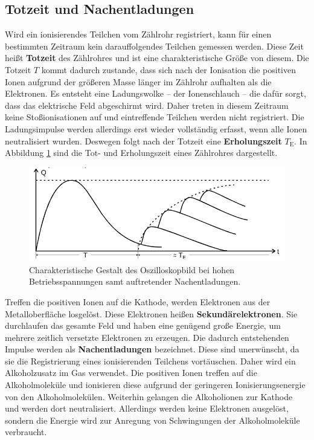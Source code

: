 \subsection{Totzeit und Nachentladungen}
Wird ein ionisierendes Teilchen vom Zählrohr registriert, kann für einen bestimmten Zeitraum
kein darauffolgendes Teilchen gemessen werden.
Diese Zeit heißt \textbf{Totzeit} des Zählrohres und ist eine charakteristische Größe von diesem.
Die Totzeit $T$ kommt dadurch zustande, dass sich nach der Ionisation die positiven Ionen
aufgrund der größeren Masse länger im Zählrohr aufhalten als die Elektronen.
Es entsteht eine Ladungswolke -- der Ionenschlauch -- die dafür sorgt, dass das elektrische Feld
abgeschirmt wird. Daher treten in diesem Zeitraum keine Stoßionisationen auf und eintreffende
Teilchen werden nicht registriert.
Die Ladungsimpulse werden allerdings erst wieder vollständig erfasst, wenn alle Ionen neutralisiert
wurden. Deswegen folgt nach der Totzeit eine \textbf{Erholungszeit} $T_{\mathrm{E}}$.
In Abbildung \ref{fig:nachladen} sind die Tot- und Erholungszeit eines Zählrohres dargestellt.
\begin{figure}
  \centering
  \includegraphics[width=\textwidth]{Bilder/erholzeit.png}
  \caption{Charakteristische Gestalt des Oszilloskopbild bei hohen Betriebsspannungen samt auftretender Nachentladungen. \cite{Anleitung}}
  \label{fig:nachladen}
\end{figure}

Treffen die positiven Ionen auf die Kathode, werden Elektronen aus der Metalloberfläche
losgelöst. Diese Elektronen heißen \textbf{Sekundärelektronen}. Sie durchlaufen das gesamte
Feld und haben eine genügend große Energie, um mehrere zeitlich versetzte Elektronen
zu erzeugen. Die dadurch entstehenden Impulse werden als \textbf{Nachentladungen} bezeichnet.
Diese sind unerwünscht, da sie die Registrierung eines ionisierenden Teilchens vortäuschen.
Daher wird ein Alkoholzusatz im Gas verwendet. Die positiven Ionen treffen auf die
Alkoholmoleküle und ionisieren diese aufgrund der geringeren Ionisierungsenergie von den
Alkoholmolekülen. Weiterhin gelangen die Alkoholionen zur Kathode und werden dort neutralisiert.
Allerdings werden keine Elektronen ausgelöst, sondern die Energie wird zur Anregung von
Schwingungen der Alkoholmoleküle verbraucht.
\FloatBarrier
